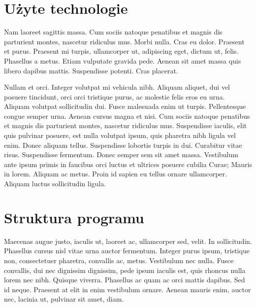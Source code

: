 \documentclass[eng,printmode]{mgr}
\begin{document}
\section{Użyte technologie}
Nam laoreet sagittis massa. Cum sociis natoque penatibus et magnis dis parturient montes, nascetur ridiculus mus. Morbi nulla. Cras eu dolor. Praesent et purus. Praesent mi turpis, ullamcorper ut, adipiscing eget, dictum ut, felis. Phasellus a metus. Etiam vulputate gravida pede. Aenean sit amet massa quis libero dapibus mattis. Suspendisse potenti. Cras placerat.

Nullam et orci. Integer volutpat mi vehicula nibh. Aliquam aliquet, dui vel posuere tincidunt, orci orci tristique purus, ac molestie felis eros eu urna. Aliquam volutpat sollicitudin dui. Fusce malesuada enim ut turpis. Pellentesque congue semper urna. Aenean cursus magna et nisi. Cum sociis natoque penatibus et magnis dis parturient montes, nascetur ridiculus mus. Suspendisse iaculis, elit quis pulvinar posuere, est nulla volutpat ipsum, quis pharetra nibh ligula vel enim. Donec aliquam tellus. Suspendisse lobortis turpis in dui. Curabitur vitae risus. Suspendisse fermentum. Donec semper sem sit amet massa. Vestibulum ante ipsum primis in faucibus orci luctus et ultrices posuere cubilia Curae; Mauris in lorem. Aliquam ac metus. Proin id sapien eu tellus ornare ullamcorper. Aliquam luctus sollicitudin ligula.

\section{Struktura programu}
Maecenas augue justo, iaculis ut, laoreet ac, ullamcorper sed, velit. In sollicitudin. Phasellus cursus nisl vitae urna auctor fermentum. Integer purus ipsum, tristique non, consectetuer pharetra, convallis ac, metus. Vestibulum nec nulla. Fusce convallis, dui nec dignissim dignissim, pede ipsum iaculis est, quis rhoncus nulla lorem nec nibh. Quisque viverra. Phasellus ac quam ac orci mattis dapibus. Sed id neque. Praesent at elit in enim vestibulum ornare. Aenean mauris enim, auctor nec, lacinia ut, pulvinar sit amet, diam.
\end{document}
